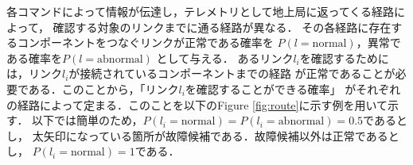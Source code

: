 \documentclass[11pt]{article}
\begin{document}
各コマンドによって情報が伝達し，テレメトリとして地上局に返ってくる経路によって，
確認する対象のリンクまでに通る経路が異なる．
その各経路に存在するコンポーネントをつなぐリンクが正常である確率を
$P(l = \text{normal})$，異常である確率を$P(l = \text{abnormal})$ %
として与える．
あるリンク$l_i$を確認するためには，リンク$l_i$が接続されているコンポーネントまでの経路
が正常であることが必要である．このことから，「リンク$l_i$を確認することができる確率」
がそれぞれの経路によって定まる．このことを以下のFigure \ref{fig:route}に示す例を用いて示す．
以下では簡単のため，$P(l_i = \text{normal}) = P(l_i = \text{abnormal}) = 0.5$であるとし，
太矢印になっている箇所が故障候補である．故障候補以外は正常であるとし，
$P(l_i = \text{normal}) =1$である．\\
\end{document}
